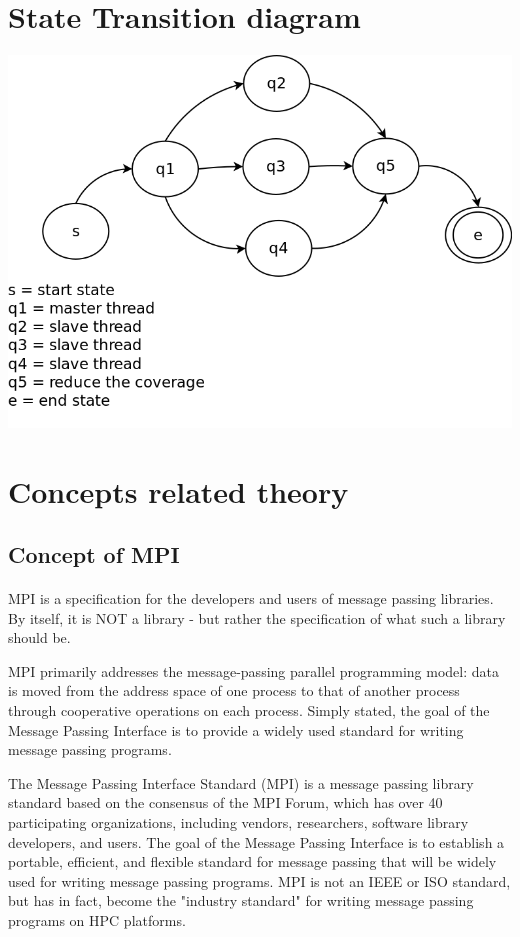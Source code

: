 \documentclass[10pt,a4paper]{article}
\begin{document}
\section{State Transition diagram}
\includegraphics[scale=0.30]{stdg.png}

\section{Concepts related theory}
\subsection{Concept of MPI}
		\paragraph{} MPI is a specification for the developers and users of message passing libraries. By itself, it is NOT a library - but rather the specification of what such a library should be. 
		
		MPI primarily addresses the message-passing parallel programming model: data is moved from the address space of one process to that of another process through cooperative operations on each process. 	 
		Simply stated, the goal of the Message Passing Interface is to provide a widely used standard for writing message passing programs. 
		
		The Message Passing Interface Standard (MPI) is a message passing library standard based on the consensus of the MPI Forum, which has over 40 participating organizations, including vendors, researchers, software library developers, and users. 	 
		The goal of the Message Passing Interface is to establish a portable, efficient, and flexible standard for message passing that will be widely used for writing message passing programs. MPI is not an IEEE or ISO standard, but has in fact, become the "industry standard" for writing message passing programs on HPC platforms. 
	
\end{document}
